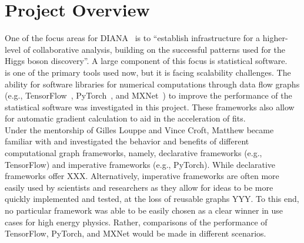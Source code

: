 \section{Project Overview}

One of the focus areas for DIANA~\cite{DIANA-proposal-2014} is to ``establish infrastructure for a higher-level of collaborative analysis, building on the successful patterns used for the Higgs boson discovery''.
A large component of this focus is statistical software.
~\cite{Verkerke:2003ir} is one of the primary tools used now, but it is facing scalability challenges.
The ability for software libraries for numerical computations through data flow graphs (e.g., TensorFlow~\cite{tensorflow2015-whitepaper}, PyTorch~\cite{paszke2017automatic}, and MXNet~\cite{DBLP:journals/corr/ChenLLLWWXXZZ15}) to improve the performance of the statistical software was investigated in this project.
These frameworks also allow for automatic gradient calculation to aid in the acceleration of fits.\\


Under the mentorship of Gilles Louppe and Vince Croft, Matthew became familiar with and investigated the behavior and benefits of different computational graph frameworks, namely, declarative frameworks (e.g., TensorFlow) and imperative frameworks (e.g., PyTorch).
While declarative frameworks offer XXX.
Alternatively, imperative frameworks are often more easily used by scientists and researchers as they allow for ideas to be more quickly implemented and tested, at the loss of reusable graphs YYY.
To this end, no particular framework was able to be easily chosen as a clear winner in use cases for high energy physics.
Rather, comparisons of the performance of TensorFlow, PyTorch, and MXNet would be made in different scenarios.\\

